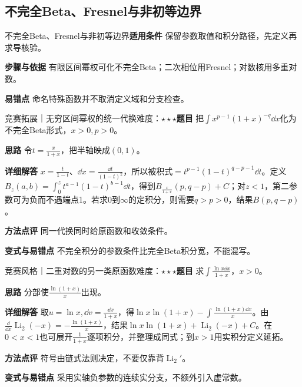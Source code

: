 \subsection{不完全Beta、Fresnel与非初等边界}\label{deep:integral_special_deep:betaextra}

\begin{method}{不完全Beta、Fresnel与非初等边界}\textbf{适用条件} 保留参数取值和积分路径，先定义再求导核验。\par\textbf{步骤与依据} 有限区间幂权可化不完全Beta；二次相位用Fresnel；对数核用多重对数。\par\textbf{易错点} 命名特殊函数并不取消定义域和分支检查。\end{method}

\begin{example}{竞赛拓展｜无穷区间幂权的统一代换}{难度：$\star\star\star$}\label{deep:ex:integral_special_deep:incompletebeta}\textbf{题目} 把$\int x^{p-1}(1+x)^{-q}\dd x$化为不完全Beta形式，$x>0,p>0$。\par\textbf{思路} 令$t=\frac{x}{1+x}$，把半轴映成$(0,1)$。\par\textbf{详细解答} $x=\frac{t}{1-t}$、$\dd x=\frac{\dd t}{(1-t)^2}$，所以被积式$=t^{p-1}(1-t)^{q-p-1}\dd t$。定义$B_z(a,b)=\int_0^zt^{a-1}(1-t)^{b-1}\dd t$，得到$B_{\frac{x}{1+x}}(p,q-p)+C$；对$z<1$，第二参数可为负而不遇端点1。若求$0$到$\infty$的定积分，则需要$q>p>0$，结果$B(p,q-p)$。\par\textbf{方法点评} 同一代换同时给原函数和收敛条件。\par\textbf{变式与易错点} 不完全积分的参数条件比完全Beta积分宽，不能混写。\end{example}

\begin{example}{竞赛风格｜二重对数的另一类原函数}{难度：$\star\star\star$}\label{deep:ex:integral_special_deep:logplus}\textbf{题目} 求$\int\frac{\ln x\dd x}{1+x}$，$x>0$。\par\textbf{思路} 分部使$\frac{\ln(1+x)}{x}$出现。\par\textbf{详细解答} 取$u=\ln x,\dd v=\frac{\dd x}{1+x}$，得$\ln x\ln(1+x)-\int\frac{\ln(1+x)\dd x}{x}$。由$\frac{\dd}{\dd x}\operatorname{Li}_2(-x)=-\frac{\ln(1+x)}{x}$，结果$\ln x\ln(1+x)+\operatorname{Li}_2(-x)+C$。在$0<x<1$也可展开$\frac{1}{1+x}$逐项积分，并整理成同式；到$x>1$用实积分定义延拓。\par\textbf{方法点评} 符号由链式法则决定，不要仅靠背$\operatorname{Li}_2'$。\par\textbf{变式与易错点} 采用实轴负参数的连续实分支，不额外引入虚常数。\end{example}

